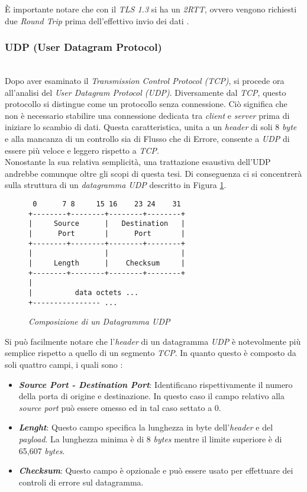 \noindent È importante notare che con il \emph{TLS 1.3} si ha un \emph{2RTT}, ovvero vengono richiesti due \emph{Round Trip} prima dell'effettivo invio dei dati \cite{site:tls}. 
\subsubsection{UDP (User Datagram Protocol)}
~\\
\indent Dopo aver esaminato il \emph{Transmission Control Protocol (TCP)},
si procede ora all'analisi del \emph{User Datagram Protocol (UDP)}. 
Diversamente dal \emph{TCP}, questo protocollo si distingue come un protocollo senza connessione. 
Ciò significa che non è necessario stabilire una connessione dedicata tra \emph{client} e \emph{server} prima di iniziare lo scambio di dati. 
Questa caratteristica, unita a un \emph{header} di soli 8 \emph{byte} e alla mancanza di un controllo sia di Flusso che di Errore, consente a \emph{UDP} di essere più veloce e leggero rispetto a \emph{TCP}.
\\
Nonostante la sua relativa semplicità, una trattazione esaustiva dell'UDP andrebbe comunque oltre gli scopi di questa tesi. 
Di conseguenza ci si concentrerà sulla struttura di un \emph{datagramma {UDP}} descritto in Figura \ref{udp-datagram}.
\\
\begin{figure}[!h]
    \centering
    \begin{BVerbatim}
 0      7 8     15 16    23 24    31
+--------+--------+--------+--------+
|     Source      |   Destination   |
|      Port       |      Port       |
+--------+--------+--------+--------+
|                 |                 |
|     Length      |    Checksum     |
+--------+--------+--------+--------+
|
|          data octets ...
+---------------- ...
        \end{BVerbatim}
    \caption{\emph{Composizione di un Datagramma UDP}}
    \label{udp-datagram}
\end{figure}

\noindent Si può facilmente notare che l'\emph{header} di un datagramma \emph{UDP} è notevolmente più semplice rispetto a quello di un segmento \emph{TCP}.
In quanto questo è composto da soli quattro campi, i quali sono :  
\begin{itemize}
    \item \textit{\textbf{Source Port - Destination Port}}: Identificano rispettivamente il numero della porta di origine e destinazione. In questo caso il campo relativo alla \emph{source port} può essere omesso ed in tal caso settato a 0.
    \item \textit{\textbf{Lenght}}: Questo campo specifica la lunghezza in byte dell'\emph{header} e del \emph{payload}. La lunghezza minima è di 8 \emph{bytes} mentre il limite superiore è di 65,607 \emph{bytes}.
    \item \textit{\textbf{Checksum}}: Questo campo è opzionale e può essere usato per effettuare dei controli di errore sul datagramma.
\end{itemize}

